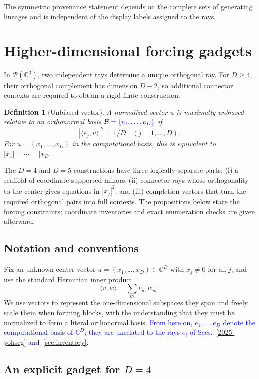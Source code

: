 \documentclass[%
  reprint,
  superscriptaddress,
  showkeys,
  amsmath,amssymb,
  aps,pra,
  longbibliography,
  floatfix,
  x11names
]{revtex4-2}
\DeclareRobustCommand{\chg}[1]{\textcolor{blue}{#1}}
\newtheorem{definition}{Definition}
\begin{document}
The symmetric provenance statement depends on the complete sets of generating lineages and is independent of the display labels assigned to the rays.






\section{Higher-dimensional forcing gadgets}
\label{2025-hdfg}

In $\mathcal{P}(\mathbb{C}^3)$, two independent rays determine a unique orthogonal ray.  For $D\geq4$, their orthogonal complement has dimension $D-2$, so additional connector contexts are required to obtain a rigid finite construction.

\begin{definition}[Unbiased vector]
\label{def:unbiased}
A normalized vector $u$ is maximally unbiased relative to an orthonormal basis $\mathcal{B}\chg{{}=\{e_1,\ldots,e_D\}}$ if
\[
|\langle e_j,u\rangle|^2=1/D\quad (j=1,\ldots,D).
\]
For $u=(x_1,\ldots,x_D)$ in the computational basis, this is equivalent to \ensuremath{|x_1|=\cdots=|x_D|}.
\end{definition}

The $D=4$ and $D=5$ constructions have three logically separate parts: (i) a scaffold of coordinate-supported minors, (ii) connector rays whose orthogonality to the center gives equations in $|x_j|^2$, and (iii) completion vectors that turn the required orthogonal pairs into full contexts.  The propositions below state the forcing constraints; coordinate inventories and exact enumeration checks are given afterward.

\subsection{Notation and conventions}
Fix an unknown center vector $u = (x_1,\dots,x_D) \in \mathbb{C}^D$ with $x_j \ne 0$ for all $j$, and use the standard Hermitian inner product
\[
\langle v,w\rangle = \sum_m \overline{v_m}\, w_m.
\]
We use vectors to represent the one-dimensional subspaces they span and freely scale them when forming blocks,
with the understanding that they must be normalized to form a literal orthonormal basis.
\chg{From here on, $e_1,\ldots,e_D$ denote the computational basis of $\mathbb{C}^D$; they are unrelated to the rays $e_i$ of Secs.~\ref{2025-yohscg} and~\ref{sec:inventory}.}

\subsection{An explicit gadget for \texorpdfstring{$D=4$}{D=4}}
\end{document}
